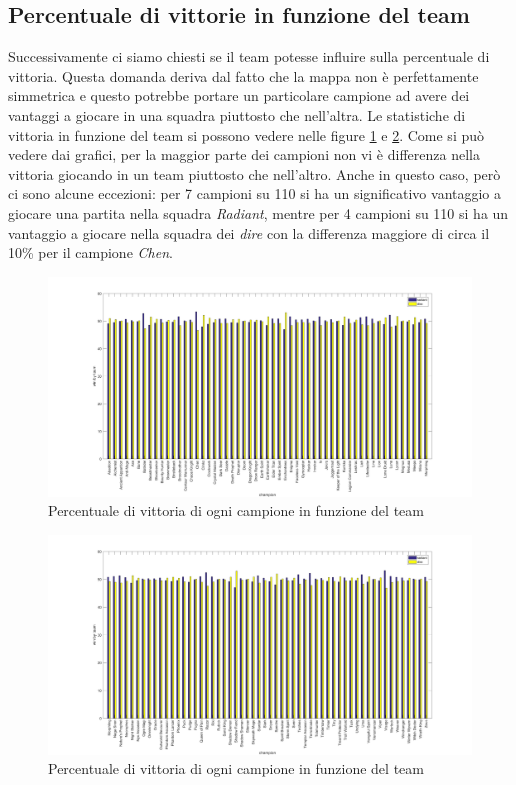 \documentclass[a4paper,12pt,openany,oneside]{book}
\begin{document}
\subsection{Percentuale di vittorie in funzione del team}
Successivamente ci siamo chiesti se il team potesse influire sulla percentuale di vittoria. Questa domanda deriva dal fatto che la mappa non è perfettamente simmetrica e questo potrebbe portare un particolare campione ad avere dei vantaggi a giocare in una squadra piuttosto che nell'altra. Le statistiche di vittoria in funzione del team si possono vedere nelle figure \ref{fig:win_by_team_1} e \ref{fig:win_by_team_2}. Come si può vedere dai grafici, per la maggior parte dei campioni non vi è differenza nella vittoria giocando in un team piuttosto che nell'altro. Anche in questo caso, però ci sono alcune eccezioni: per 7 campioni su 110 si ha un significativo vantaggio a giocare una partita nella squadra \textit{Radiant}, mentre per 4 campioni su 110 si ha un vantaggio a giocare nella squadra dei \textit{dire} con la differenza maggiore di circa il 10\% per il campione \textit{Chen}.
\begin{figure}[H]
	\includegraphics[width=\linewidth]{pics/win_by_team_1.png}
	\caption{Percentuale di vittoria di ogni campione in funzione del team}
	\label{fig:win_by_team_1}
\end{figure}
\begin{figure}[H]
	\includegraphics[width=\linewidth]{pics/win_by_team_2.png}
	\caption{Percentuale di vittoria di ogni campione in funzione del team}
	\label{fig:win_by_team_2}
\end{figure}
\end{document}
